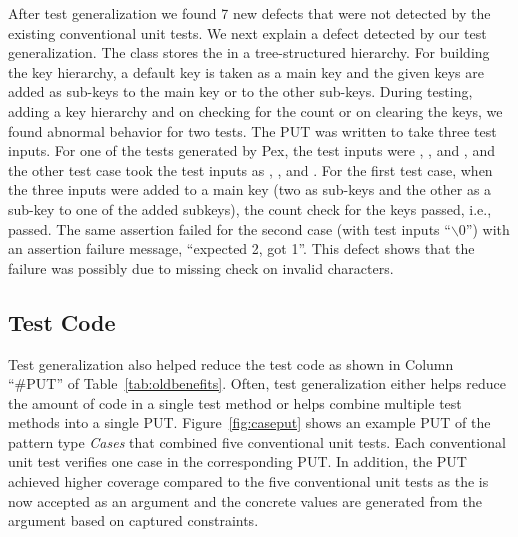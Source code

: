After test generalization we found 7 new defects that were not detected by
the existing conventional unit tests. We next explain a defect detected 
by our test generalization. The  
class stores the  in a tree-structured hierarchy. 
For building the key hierarchy, a default key is taken as a main 
key and the given keys are added as sub-keys to the main key or to the other sub-keys. During testing, adding a key hierarchy and on checking for the count or on clearing the keys, we found abnormal behavior for two tests. The PUT was written to take three test inputs. For one of the tests generated by Pex, the test inputs were , , and , and the other test case took the test inputs as , , and . For the first test case, when the three inputs were added to a main key (two as sub-keys and the other as a sub-key to one of the added subkeys), the count check for the keys passed, i.e.,  passed. The same assertion failed for the second case (with test inputs ``$\backslash$0'') with an assertion failure message, ``expected 2, got 1''. This defect shows that the failure was possibly due to missing check on invalid characters. 
\subsection{Test Code}
\label{sec:testcode}

Test generalization also helped reduce the 
test code as shown in Column ``\#PUT'' of Table~\ref{tab:oldbenefits}. Often, test
generalization either helps reduce the amount of code in a single test method or
helps combine multiple test methods into a single PUT. Figure~\ref{fig:caseput}
shows an example PUT of the pattern type \emph{Cases} that combined five conventional unit tests. Each conventional
unit test verifies one case in the corresponding PUT. In addition, the PUT achieved higher coverage compared
to the five conventional unit tests as the  is now accepted
as an argument and the concrete values are generated from the argument
based on captured constraints.

